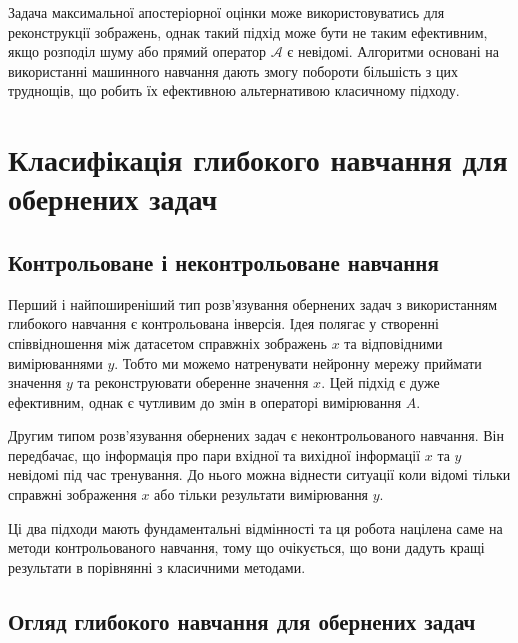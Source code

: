 \documentclass[14pt,a4paper]{extarticle}
\newcounter{e}
\numberwithin{equation}{section}
\numberwithin{figure}{section}
\begin{document}
	Задача максимальної апостеріорної оцінки може використовуватись для реконструкції зображень, однак такий підхід може бути не таким ефективним, якщо розподіл шуму або прямий оператор $\mathcal{A}$ є невідомі.  
	Алгоритми основані на використанні машинного навчання дають змогу побороти більшість з цих труднощів, що робить їх ефективною альтернативою класичному підходу.


	\newpage
	\thispagestyle{empty}
	\section{Класифікація глибокого навчання для обернених задач}

	\subsection{Контрольоване і неконтрольоване навчання}
	Перший і найпоширеніший тип розв'язування обернених задач з використанням глибокого навчання є контрольована інверсія. Ідея полягає у створенні співвідношення між датасетом справжніх зображень $x$ та відповідними вимірюваннями $y$. Тобто ми можемо натренувати нейронну мережу приймати значення $y$ та реконструювати оберенне значення $x$. Цей підхід є дуже ефективним, однак є чутливим до змін в операторі вимірювання $A$. 
	
	Другим типом розв'язування обернених задач є неконтрольованого навчання. Він передбачає, що інформація про пари вхідної та вихідної інформації $x$ та $y$ невідомі під час тренування. До нього можна віднести ситуації коли відомі тільки справжні зображення $x$ або тільки результати вимірювання $y$.
	
	Ці два підходи мають фундаментальні відмінності та ця робота націлена саме на методи контрольованого навчання, тому що очікується, що вони дадуть кращі результати в порівнянні з класичними методами. 
	
	\subsection{Огляд глибокого навчання для обернених задач}
	
\end{document}
